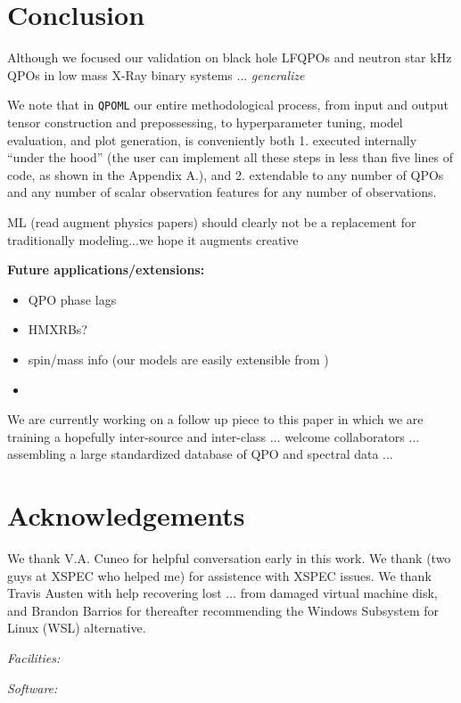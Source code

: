 \documentclass[fleqn,usenatbib]{mnras}
\begin{document}
\section{Conclusion} \label{sec:conclusion}

Although we focused our validation on black hole LFQPOs and neutron star kHz QPOs in low mass X-Ray binary systems ... \textit{generalize}

We note that in \texttt{QPOML} our entire methodological process, from input and output tensor construction and prepossessing, to hyperparameter tuning, model evaluation, and plot generation, is conveniently both 1. executed internally ``under the hood'' (the user can implement all these steps in less than five lines of code, as shown in the Appendix A.), and 2. extendable to any number of QPOs and any number of scalar observation features for any number of observations.

ML (read augment physics papers) should clearly not be a replacement for traditionally modeling...we hope it augments creative 

\textbf{Future applications/extensions:}

\begin{itemize}
    \item QPO phase lags
    \item HMXRBs?
    \item spin/mass info (our models are easily extensible from )
    \item 
\end{itemize}

We are currently working on a follow up piece to this paper in which we are training a hopefully inter-source and inter-class ... welcome collaborators ... assembling a large standardized database of QPO and spectral data ... 

\section{Acknowledgements}

We thank V.A. Cuneo for helpful conversation early in this work. We thank (two guys at XSPEC who helped me) for assistence with XSPEC issues. We thank Travis Austen with help recovering lost ... from damaged virtual machine disk, and Brandon Barrios for thereafter recommending the Windows Subsystem for Linux (WSL) alternative. 

\noindent \textit{Facilities:}

\noindent \textit{Software:}
\end{document}

